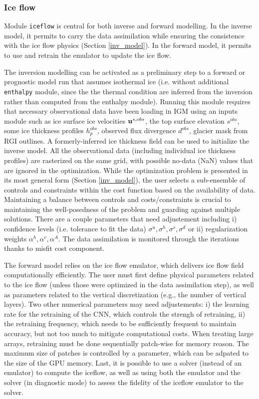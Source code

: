 \documentclass[gmd]{copernicus}
\begin{document}
\subsubsection{Ice flow}
\label{module_iceflow}

Module \texttt{iceflow} is central for both inverse and forward modelling. In the inverse model, it permits to carry the data assimilation while ensuring the consistence with the ice flow physics (Section \ref{inv_model}). In the forward model, it permits to use and retrain the emulator to update the ice flow.

The inversion modelling can be activated as a preliminary step to a forward or prognostic model run that assumes isothermal ice (i.e. without additional \texttt{enthalpy} module, since the the thermal condition are inferred from the inversion rather than computed from the enthalpy module). Running this module requires that necessary observational data have been loading in IGM using an inputs module such as ice surface ice velocities ${\bf u}^{s,obs}$, the top surface elevation $s^{obs}$, some ice thickness profiles $h_p^{obs}$, observed flux divergence $d^{obs}$, glacier mask from RGI outlines. A formerly-inferred ice thickness field \citep{farinotti2019consensus,millan2022ice} can be used to initialize the inverse model. All the observational data (including individual ice thickness profiles) are rasterized on the same grid, with possible no-data (NaN) values that are ignored in the optimization. While the optimization problem is presented in its most general form (Section \ref{inv_model}), the user selects a sub-ensemble of controls and constraints within the cost function based on the availability of data. Maintaining a balance between controls and costs/constraints is crucial to maintaining the well-posedness of the problem and guarding against multiple solutions. There are a couple parameters that need adjustement including i) confidence levels (i.e. tolerance to fit the data) $\sigma^u, \sigma^h, \sigma^s, \sigma^d$ or ii) regularization weights $\alpha^h, \alpha^c, \alpha^A$. The data assimilation is monitored through the iterations thanks to misfit cost component. 

The forward model relies on the ice flow emulator, which delivers ice flow field computationally efficiently. The user must first define physical parameters related to the ice flow (unless those were optimized in the data assimilation step), as well as parameters related to the vertical discretization (e.g., the number of vertical layers). Two other numerical parameters may need adjustements: i) the learning rate for the retraining of the CNN, which controls the strengh of retraining, ii) the retraining frequency, which needs to be sufficiently frequent to maintain accuracy, but not too much to mitigate computational costs. When treating large arrays, retraining must be done sequentially patch-wise for memory reason. The maximum size of patches is controlled by a parameter, which can be adpated to the size of the GPU memory. Last, it is possible to use a solver (instead of an emulator) to compute the iceflow, as well as using both the emulator and the solver (in diagnostic mode) to assess the fidelity of the iceflow emulator to the solver.
\end{document}
